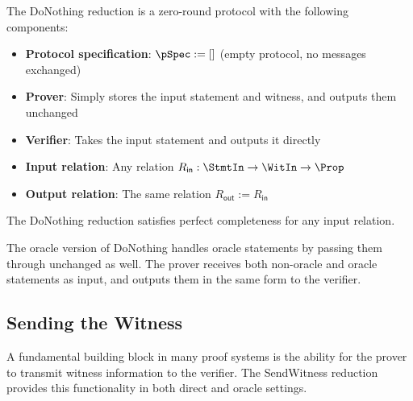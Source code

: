 \begin{definition}
    \label{def:donothing_reduction}
    The DoNothing reduction is a zero-round protocol with the following components:
    \begin{itemize}
        \item \textbf{Protocol specification}: $\pSpec := []$ (empty protocol, no messages exchanged)
        \item \textbf{Prover}: Simply stores the input statement and witness, and outputs them unchanged
        \item \textbf{Verifier}: Takes the input statement and outputs it directly
        \item \textbf{Input relation}: Any relation $R_{\mathsf{in}} : \StmtIn \to \WitIn \to \Prop$
        \item \textbf{Output relation}: The same relation $R_{\mathsf{out}} := R_{\mathsf{in}}$
    \end{itemize}
\end{definition}

\begin{theorem}
    The DoNothing reduction satisfies perfect completeness for any input relation.
\end{theorem}

The oracle version of DoNothing handles oracle statements by passing them through unchanged as well. The prover receives both non-oracle and oracle statements as input, and outputs them in the same form to the verifier.

\subsection{Sending the Witness}

A fundamental building block in many proof systems is the ability for the prover to transmit witness information to the verifier. The SendWitness reduction provides this functionality in both direct and oracle settings.

